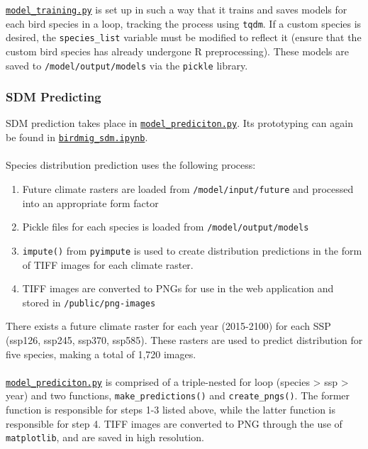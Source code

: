 \documentclass{article}
\begin{document}
\noindent \texttt{\href{run:../model/model\_training.py}{model\_training.py}} is set up in such a way that it trains and saves models for each bird species in a loop, tracking the process using \texttt{tqdm}. If a custom species is desired, the \texttt{species\_list} variable must be modified to reflect it (ensure that the custom bird species has already undergone R preprocessing). These models are saved to \texttt{/model/output/models} via the \texttt{pickle} library.

\subsubsection{SDM Predicting}

SDM prediction takes place in \texttt{\href{run:../model/model\_prediction.py}{model\_prediciton.py}}. Its prototyping can again be found in \texttt{\href{run:../model/birdmig\_sdm.ipynb}{birdmig\_sdm.ipynb}}.
\\\\
Species distribution prediction uses the following process:
\begin{enumerate}
	\item Future climate rasters are loaded from \texttt{/model/input/future} and processed into an appropriate form factor
	\item Pickle files for each species is loaded from \texttt{/model/output/models}
	\item \texttt{impute()} from \texttt{pyimpute} is used to create distribution predictions in the form of TIFF images for each climate raster.
	\item TIFF images are converted to PNGs for use in the web application and stored in \texttt{/public/png-images}
\end{enumerate}

\noindent There exists a future climate raster for each year (2015-2100) for each SSP (ssp126, ssp245, ssp370, ssp585). These rasters are used to predict distribution for five species, making a total of 1,720 images.
\\\\
\texttt{\href{run:../model/model\_prediction.py}{model\_prediciton.py}} is comprised of a triple-nested for loop (species > ssp > year) and two functions, \texttt{make\_predictions()} and \texttt{create\_pngs()}. The former function is responsible for steps 1-3 listed above, while the latter function is responsible for step 4. TIFF images are converted to PNG through the use of \texttt{matplotlib}, and are saved in high resolution.
\end{document}
